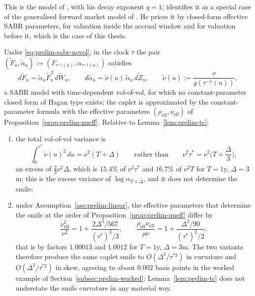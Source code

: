 \documentclass[../../../main.tex]{subfiles}
\begin{document}
This is the model of \cite[eqs.~(3)--(4), p.~4]{willems2020}, with his decay exponent $q=1$; \cite[Remark~3.2, p.~6]{willems2020} identifies it as a special case of the generalised forward market model of \cite{lyashenko2019}. He prices it by closed-form effective SABR parameters, \cite[Thm.~4.1, p.~6]{willems2020} for valuation inside the accrual window and \cite[Thm.~4.2, p.~7]{willems2020} for valuation before it, which is the case of this thesis.

\begin{proposition}\label{prop:prelim-novol}
Under \eqref{eq:prelim-sabr-novol}, in the clock $\tau$ the pair $(\tilde F_u,\tilde\alpha_u):=(F_{\tau^{-1}(u)},\alpha_{\tau^{-1}(u)})$ satisfies
\begin{equation}\label{eq:prelim-novol-clock}
d\tilde F_u=\tilde\alpha_u\tilde F_u^{\beta}\,d\tilde W_u,\qquad d\tilde\alpha_u=\tilde\nu(u)\,\tilde\alpha_u\,d\tilde Z_u,\qquad \tilde\nu(u):=\frac{\nu}{g(\tau^{-1}(u))},
\end{equation}
a SABR model with time-dependent vol-of-vol, for which no constant-parameter closed form of Hagan type exists; the caplet is approximated by the constant-parameter formula with the effective parameters $(\rho_{\mathrm{eff}},\nu_{\mathrm{eff}})$ of Proposition~\ref{prop:prelim-nueff}. Relative to Lemma~\ref{lem:prelim-tc}:
\begin{enumerate}[nosep,label=(\roman*)]
\item the total vol-of-vol variance is
\begin{equation}\label{eq:prelim-novol-total}
\int_0^{\tau^*}\tilde\nu(u)^2\,du=\nu^2(T+\Delta)\qquad\text{rather than}\qquad\nu^2\tau^*=\nu^2\Big(T+\frac\Delta3\Big),
\end{equation}
an excess of $\tfrac23\nu^2\Delta$, which is $15.4\%$ of $\nu^2\tau^*$ and $16.7\%$ of $\nu^2T$ for $T=1$y, $\Delta=3$m; this is the excess variance of $\log\alpha_{T+\Delta}$, and it does not determine the smile;
\item under Assumption~\ref{ass:prelim-linear}, the effective parameters that determine the smile at the order of Proposition~\ref{prop:prelim-nueff} differ by
\begin{equation}\label{eq:prelim-novol-eff}
\frac{\nu_{\mathrm{eff}}^2}{\nu^2}=1+\frac{2\Delta^3/567}{(\tau^*)^3/3},\qquad
\frac{\rho_{\mathrm{eff}}\nu_{\mathrm{eff}}}{\rho\nu}=1+\frac{\Delta^2/90}{(\tau^*)^2/2},
\end{equation}
that is by factors $1.00013$ and $1.0012$ for $T=1$y, $\Delta=3$m. The two variants therefore produce the same caplet smile to $O(\Delta^3/\tau^{*3})$ in curvature and $O(\Delta^2/\tau^{*2})$ in skew, agreeing to about $0.002$ basis points in the worked example of Section~\ref{subsec:prelim-worked}: Lemma~\ref{lem:prelim-tc} does not understate the smile curvature in any material way.
\end{enumerate}
\end{proposition}
\end{document}
